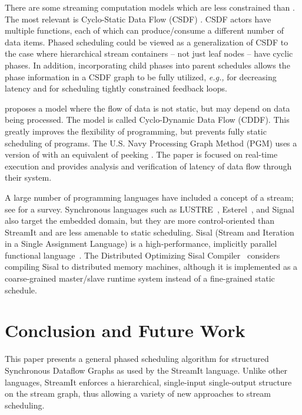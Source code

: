 \documentclass{sig-alt-full}
\begin{document}
There are some streaming computation models which are less constrained
than {\SDF}. The most relevant is Cyclo-Static Data Flow (CSDF)
\cite{BELP96,parks95comparison}.  CSDF actors have multiple {\work}
functions, each of which can produce/consume a different number of
data items.  Phased scheduling could be viewed as a generalization of
CSDF to the case where hierarchical stream containers -- not just leaf
nodes -- have cyclic phases.  In addition, incorporating child phases
into parent schedules allows the phase information in a CSDF graph to
be fully utilized, {\it e.g.,} for decreasing latency and for
scheduling tightly constrained feedback loops.

\cite{wauters96cyclodynamic} proposes a model where the flow of data
is not static, but may depend on data being processed. The model is
called Cyclo-Dynamic Data Flow (CDDF). This greatly improves the
flexibility of programming, but prevents fully static scheduling of
programs. The U.S. Navy Processing Graph Method (PGM) uses a version
of {\SDF} with an equivalent of peeking \cite{goddard00navy}.  The
paper is focused on real-time execution and provides analysis and
verification of latency of data flow through their system.

A large number of programming languages have included a concept of a
stream; see \cite{survey97} for a survey.  Synchronous languages such
as LUSTRE~\cite{lustre}, Esterel~\cite{esterel92}, and
Signal~\cite{signal} also target the embedded domain, but they are
more control-oriented than StreamIt and are less amenable to static
scheduling.  Sisal (Stream and Iteration in a Single Assignment
Language) is a high-performance, implicitly parallel functional
language~\cite{sisal}.  The Distributed Optimizing Sisal
Compiler~\cite{sisal} considers compiling Sisal to distributed memory
machines, although it is implemented as a coarse-grained master/slave
runtime system instead of a fine-grained static schedule.

\section{Conclusion and Future Work}
\label{chpt:conclusion}

This paper presents a general phased scheduling algorithm for
structured Synchronous Dataflow Graphs as used by the StreamIt
language.  Unlike other languages, StreamIt enforces a hierarchical,
single-input single-output structure on the stream graph, thus
allowing a variety of new approaches to stream scheduling.
\end{document}
